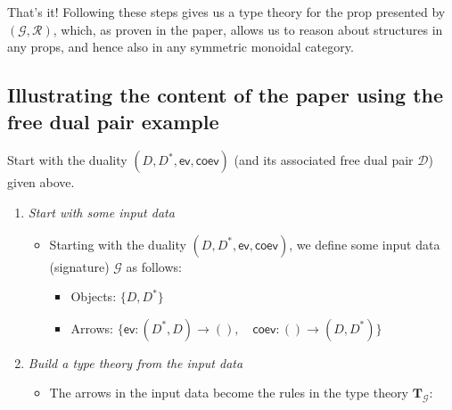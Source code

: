 \documentclass[pra,floatfix,
amsmath,superscriptaddress, 12pt]{article}
\theoremstyle{definition}
\newcommand{\cG}{\mathcal{G}}
\newcommand{\cR}{\mathcal{R}}
\newcommand{\cD}{\mathcal{D}}
\newcommand{\msf}[1]{\mathsf{#1}}
\begin{document}
That's it! Following these steps gives us a type theory for the prop presented by $(\cG,\cR)$, which, as proven in the paper, allows us to reason about structures in any props, and hence also in any symmetric monoidal category.\\


\subsection{Illustrating the content of the paper using the free dual pair example}


Start with the duality $(D,D^*,\textsf{ev},\textsf{coev})$ (and its associated free dual pair $\cD$) given above.

\begin{enumerate}
	\item \textit{Start with some input data}
	\begin{itemize}
	\item Starting with the duality $(D,D^*,\textsf{ev},\textsf{coev})$, we define some input data (signature) $\cG$ as follows:
	\begin{itemize}
		\item Objects: $\{D, D^*\}$
		\item Arrows: $\{\msf{ev}:(D^*,D)\to (), \quad \msf{coev}:()\to (D, D^*)\}$
	\end{itemize}
	\end{itemize}
		
	\item \textit{Build a type theory from the input data}
		\begin{itemize}	
		\item The arrows in the input data become the rules in the type theory $\mathbf{T}_\cG$:
		

\end{itemize}
\end{enumerate}
\end{document}
